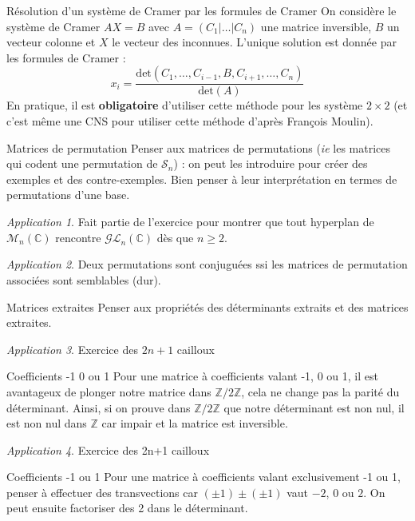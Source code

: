 \documentclass[french]{book}
\newcommand{\Z}{\mathbb{Z}}
\newcommand{\C}{\mathbb{C}}
\theoremstyle{plain}
\theoremstyle{definition}
\theoremstyle{remark}
\newtheorem*{app}{Application}
\begin{document}
\begin{AS}{Résolution d'un système de Cramer par les formules de Cramer} On considère le système de Cramer $AX=B$ avec $A=(C_1|\ldots|C_n)$ une matrice inversible, $B$ un vecteur colonne et $X$ le vecteur des inconnues. L'unique solution est donnée par les formules de Cramer : $$x_i=\frac{\text{det}(C_1,\ldots,C_{i-1},B,C_{i+1},\ldots,C_n)}{\text{det}(A)}$$ En pratique, il est \textbf{obligatoire} d'utiliser cette méthode pour les système $2\times2$ (et c'est même une CNS pour utiliser cette méthode d'après François Moulin).
\end{AS}
\begin{AS}{Matrices de permutation} Penser aux matrices de permutations (\textit{ie} les matrices qui codent une permutation de $\mathcal{S}_n$) : on peut les introduire pour créer des exemples et des contre-exemples. Bien penser à leur interprétation en termes de permutations d'une base.
\end{AS}
\begin{app}
	Fait partie de l'exercice pour montrer que tout hyperplan de $\mathcal{M}_n(\C)$ rencontre $\mathcal{GL}_n(\C)$ dès que $n\geqslant2$.
\end{app}
\begin{app}
	Deux permutations sont conjuguées ssi les matrices de permutation associées sont semblables (dur).
\end{app}
\begin{AS}{Matrices extraites} Penser aux propriétés des déterminants extraits et des matrices extraites.
\end{AS}
\begin{app}
	Exercice des $2n+1$ cailloux
\end{app}
\begin{AS}{Coefficients -1 0 ou 1} Pour une matrice à coefficients valant -1, 0 ou 1, il est avantageux de plonger notre matrice dans $\Z/2\Z$, cela ne change pas la parité du déterminant. Ainsi, si on prouve dans $\Z/2\Z$ que notre déterminant est non nul, il est non nul dans $\Z$ car impair et la matrice est inversible.
\end{AS}
\begin{app} Exercice des 2n+1 cailloux \end{app}
\begin{AS}{Coefficients -1 ou 1} Pour une matrice à coefficients valant exclusivement -1 ou 1, penser à effectuer des transvections car $(\pm1)\pm(\pm 1)$ vaut $-2$, $0$ ou $2$. On peut ensuite factoriser des 2 dans le déterminant.
\end{AS}
\end{document}
